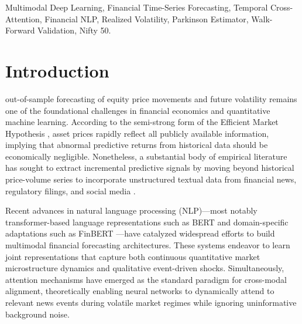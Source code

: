 \documentclass[10pt,journal,compsoc,twocolumn]{IEEEtran}
\begin{document}
{\begin{abstract}
cutoffs, and benchmark symmetry in financial machine learning.
\end{abstract}

\begin{IEEEkeywords}
Multimodal Deep Learning, Financial Time-Series Forecasting, Temporal Cross-Attention, Financial NLP, Realized Volatility, Parkinson Estimator, Walk-Forward Validation, Nifty 50.
\end{IEEEkeywords}}

\maketitle
\IEEEdisplaynontitleabstractindextext
\IEEEpeerreviewmaketitle

\section{Introduction}
 out-of-sample forecasting of equity price movements and future volatility remains one of the foundational challenges in financial economics and quantitative machine learning. According to the semi-strong form of the Efficient Market Hypothesis \cite{fama1970efficient}, asset prices rapidly reflect all publicly available information, implying that abnormal predictive returns from historical data should be economically negligible. Nonetheless, a substantial body of empirical literature has sought to extract incremental predictive signals by moving beyond historical price-volume series to incorporate unstructured textual data from financial news, regulatory filings, and social media \cite{tetlock2007giving, bollen2011twitter, ding2015deep}.

Recent advances in natural language processing (NLP)---most notably transformer-based language representations such as BERT \cite{devlin2018bert} and domain-specific adaptations such as FinBERT \cite{araci2019finbert}---have catalyzed widespread efforts to build multimodal financial forecasting architectures. These systems endeavor to learn joint representations that capture both continuous quantitative market microstructure dynamics and qualitative event-driven shocks. Simultaneously, attention mechanisms \cite{vaswani2017attention} have emerged as the standard paradigm for cross-modal alignment, theoretically enabling neural networks to dynamically attend to relevant news events during volatile market regimes while ignoring uninformative background noise.
\end{document}

